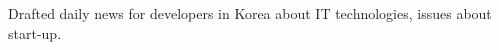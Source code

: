 

\begin{cvparagraph}

  {
  \begin{cvitems} %
    \item {Drafted daily news for developers in Korea about IT technologies, issues about start-up.}
  \end{cvitems}
  }
\end{cvparagraph}
